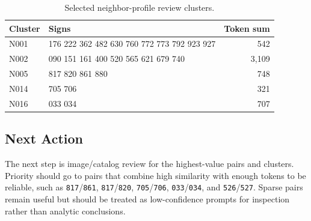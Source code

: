\begin{table}[htbp]
\centering
\begin{tabular}{lp{}r}
\toprule
\textbf{Cluster} & \textbf{Signs} & \textbf{Token sum} \\
\midrule
N001 & 176 222 362 482 630 760 772 773 792 923 927 & 542 \\
N002 & 090 151 161 400 520 565 621 679 740 & 3,109 \\
N005 & 817 820 861 880 & 748 \\
N014 & 705 706 & 321 \\
N016 & 033 034 & 707 \\
\bottomrule
\end{tabular}
\caption{Selected neighbor-profile review clusters.}
\label{tab:neighbor-clusters}
\end{table}

\subsection{Next Action}

The next step is image/catalog review for the highest-value pairs and clusters. Priority should go to pairs that combine high similarity with enough tokens to be reliable, such as \texttt{817}/\texttt{861}, \texttt{817}/\texttt{820}, \texttt{705}/\texttt{706}, \texttt{033}/\texttt{034}, and \texttt{526}/\texttt{527}. Sparse pairs remain useful but should be treated as low-confidence prompts for inspection rather than analytic conclusions.
